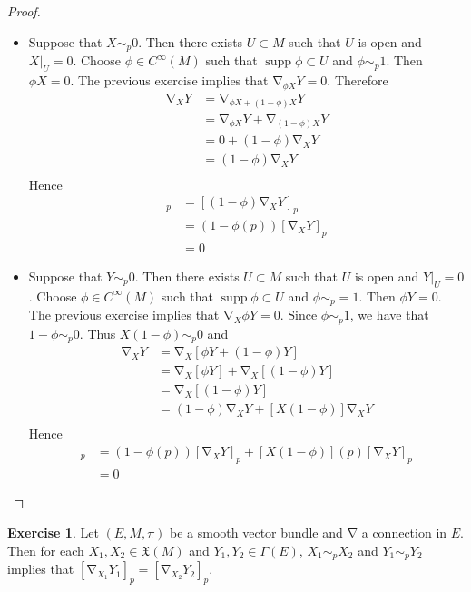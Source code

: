 \documentclass{book}
\theoremstyle{definition}
\newtheorem{ex}[definition]{Exercise}
\newcommand{\Gam}{\Gamma}
\newcommand{\MFX}{\mathfrak{X}}
\DeclareMathOperator{\supp}{supp}
\DeclareMathOperator{\nab}{\nabla}
\DeclareMathOperator*{\0}{\mbf{0}}
\DeclareMathOperator*{\1}{\mbf{1}}
\begin{document}
	\begin{proof}\
		\begin{itemize}
			\item Suppose that $X \sim_p 0$. Then there exists $U \subset M$ such that $U$ is open and $X|_U = 0$. Choose $\phi  \in C^{\infty}(M)$ such that $\supp \phi  \subset U$ and $\phi \sim_p 1$. Then $\phi  X = 0$. The previous exercise implies that $\nab_{\phi  X} Y = 0$. Therefore
			\begin{align*}
				\nab_X Y
				& = \nab_{\phi  X + (1- \phi )X}Y \\
				& = \nab_{\phi  X}Y + \nab_{(1 - \phi ) X}Y \\
				& = 0 + (1 - \phi )\nab_X Y \\
				& = (1 - \phi )\nab_X Y \\
			\end{align*}
			Hence 
			\begin{align*}
				[\nab_X Y]_p
				& =[(1 - \phi )\nab_X Y]_p \\
				& = (1 - \phi (p))[\nab_X Y]_p \\
				& = 0 
			\end{align*} 
			\item Suppose that $Y \sim_p 0$. Then there exists $U \subset M$ such that $U$ is open and $Y|_U = 0$. Choose $\phi \in C^{\infty}(M)$ such that $\supp \phi  \subset U$ and $\phi \sim_p = 1$. Then $\phi  Y = 0$. The previous exercise implies that $\nab_X \phi Y = 0$. Since $\phi \sim_p 1$, we have that $1 - \phi \sim_p 0$. Thus $X (1 - \phi) \sim_p 0$ and 
			\begin{align*}
				\nab_X Y
				& = \nab_X [\phi Y + (1- \phi)Y] \\
				& = \nab_X [\phi Y] + \nab_X[(1 - \phi) Y] \\
				& = \nab_X[(1 - \phi) Y] \\
				& = (1- \phi) \nab_X Y + [X(1 - \phi)] \nab_X Y \\
			\end{align*}
			Hence
			\begin{align*}
				[\nab_X Y]_p
				& = (1- \phi(p)) [\nab_X Y]_p + [X(1 - \phi)](p) [\nab_X Y]_p \\ 
				& = 0
			\end{align*} 
		\end{itemize}
	\end{proof}

	\begin{ex}
		Let $(E, M, \pi)$ be a smooth vector bundle and $\nab$ a connection in $E$. Then for each $X_1, X_2 \in \MFX(M)$ and $Y_1, Y_2 \in \Gam(E)$, $X_1 \sim_p X_2$ and $Y_1 \sim_p Y_2$ implies that $[\nab_{X_1}Y_1]_p = [\nab_{X_2}Y_2]_p $.
	\end{ex}
\end{document}
